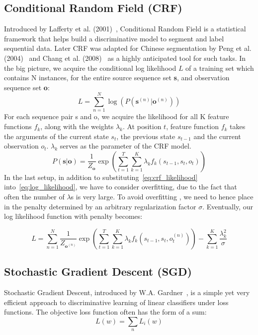 \documentclass[UTF8,11pt]{article}
\begin{document}
\subsection{Conditional Random Field (CRF)}
\noindent Introduced by Lafferty et al. (2001)~\cite{crf}, Conditional Random Field is a statistical framework that helps build a discriminative model to segment and label sequential data. Later CRF was adapted for Chinese segmentation by Peng et al. (2004)~\cite{biblo0} and Chang et al. (2008)~\cite{biblo1} as a highly anticipated tool for such tasks. \newline
\indent In the big picture, we acquire the conditional log likelihood $L$ of a training set which contains N instances, for the entire source sequence set \textbf{s}, and observation sequence set \textbf{o}:
\begin{equation} \label{eq:log_likelihood}
    L = \sum_{n=1}^N \log(P( \mathbf{s}^{(n)} | \mathbf{o}^{(n)} ))
\end{equation}
\indent For each sequence pair s and o, we acquire the likelihood for all K feature functions $f_k$, along with the weights $\lambda_k$. At position $t$, feature function $f_k$ takes the arguments of the current state $s_t$, the previous state $s_{t-1}$ and the current observation $o_t$. $\lambda_k$ serves as the parameter of the CRF model.
\begin{equation} \label{eq:crf_likelihood}
    P(\mathbf{s}|\mathbf{o}) = \frac{1}{Z_{\mathbf{o}}} \exp \left( \sum_{t=1}^{T} \sum_{k=1}^K \lambda_k f_k(s_{t-1}, s_t, o_t) \right)
\end{equation}
\indent In the last setup, in addition to substituting~\ref{eq:crf_likelihood} into~\ref{eq:log_likelihood}, we have to consider overfitting, due to the fact that often the number of $\lambda$s is very large. To avoid overfitting , we need to hence place in the penalty determined by an arbitrary regularization factor $\sigma$. Eventually, our log likelihood function with penalty becomes:

\begin{equation} \label{eq:crf_log}
    L = \sum_{n=1}^{N} \frac{1}{Z_{\mathbf{o}^{(n)}}} \exp \left( \sum_{t=1}^{T} \sum_{k=1}^K \lambda_k f_k (s_{t-1}, s_t, o^{(n)}_t)\right) - \sum_{k=1}^K \frac{\lambda_k^2}{\sigma}
\end{equation}
\subsection{Stochastic Gradient Descent (SGD)}
\noindent Stochastic Gradient Descent, introduced by W.A. Gardner~\cite{gradient}, is a simple yet very efficient approach to discriminative learning of linear classifiers under loss functions. The objective loss function often has the form of a sum:
\begin{equation}
    L(w) = \sum_{n} L_i (w)
\end{equation}
\end{document}
